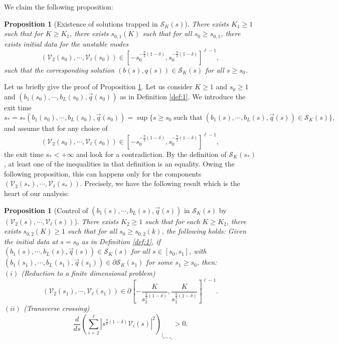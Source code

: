 \documentclass[11pt]{aims}
\newtheorem{proposition}[theorem]{Proposition}
\theoremstyle{definition}
\numberwithin{equation}{section}
\begin{document}
We claim the following proposition:
\begin{proposition}[Existence of solutions trapped in ${\mathcal{S}}_K(s)$] \label{prop:exist} There exists $K_1 \geq 1$ such that for $K \geq K_1$, there exists $s_{0,1}(K)$ such that for all $s_0 \geq s_{0,1}$, there exists initial data for the unstable modes 
$$({\mathcal{V}}_2(s_0), \cdots, {\mathcal{V}}_\ell(s_0)) \in \left[-s_0^{-\frac{\eta}{2}(1 - \delta)},s_0^{-\frac{\eta}{2}(1 - \delta)}\right]^{\ell - 1},$$
such that the corresponding solution $(b(s),q(s)) \in {\mathcal{S}}_K(s)$ for all $s \geq s_0$.
\end{proposition}
Let us briefly give the proof of Proposition \ref{prop:exist}. Let us consider $K \geq 1$ and $s_0 \geq 1$ and $(b_1(s_0),\cdots, b_L(s_0), \vec q(s_0))$ as in Definition \ref{def:1}. We introduce the exit time 
$$s_* = s_*(b_1(s_0), \cdots, b_L(s_0), \vec q(s_0)) = \sup\{s \geq s_0 \; \text{such that}\; (b_1(s),\cdots, b_L(s), \vec q(s)) \in {\mathcal{S}}_K(s)\},$$
and assume that for any choice of 
$$({\mathcal{V}}_2(s_0), \cdots, {\mathcal{V}}_\ell(s_0)) \in \left[-s_0^{-\frac{\eta}{2}(1 - \delta)},s_0^{-\frac{\eta}{2}(1 - \delta)}\right]^{\ell - 1},$$
the exit time $s_* < +\infty$ and look for a contradiction. By the definition of ${\mathcal{S}}_K(s_*)$, at least one of the inequalities in that definition is an equality. Owing the following proposition, this can happens only for the components $({\mathcal{V}}_2(s_*), \cdots, {\mathcal{V}}_\ell(s_*))$. Precisely, we have the following result which is the heart of our analysis:

\begin{proposition}[Control of $(b_1(s), \cdots, b_L(s), \vec q(s))$ in ${\mathcal{S}}_K(s)$ by $({\mathcal{V}}_2(s), \cdots, {\mathcal{V}}_\ell(s))$] \label{prop:redu} There exists $K_2 \geq 1$ such that for each $K \geq K_2$, there exists $s_{0,2}(K) \geq 1$ such that for all $s_0 \geq s_{0,2}(k)$, the following holds: Given the initial data at $s = s_0$ as in Definition \ref{def:1}, if $(b_1(s), \cdots, b_L(s), \vec q(s)) \in {\mathcal{S}}_K(s)$ for all $s \in [s_0, s_1]$, with $(b_1(s_1), \cdots, b_L(s_1), \vec q(s_1)) \in \partial {\mathcal{S}}_K(s_1)$ for some $s_1 \geq s_0$, then:\\
$(i)$ (Reduction to a finite dimensional problem)
$$({\mathcal{V}}_2(s_1), \cdots, {\mathcal{V}}_\ell(s_1)) \in \partial\left[- \frac{K}{s_1^{\frac{\eta}{2}(1 - \delta)}}, \frac{K}{s_1^{\frac{\eta}{2}(1 - \delta)}} \right]^{\ell - 1}.$$
$(ii)$ (Transverse crossing)
$$\frac{d}{ds}\left(\sum_{i = 2}^\ell \left|s^{\frac{\eta}{2}(1 - \delta)}{\mathcal{V}}_i(s)\right|^2\right)_{\big|_{s = s_1} }> 0.$$
\end{proposition} 
\end{document}
